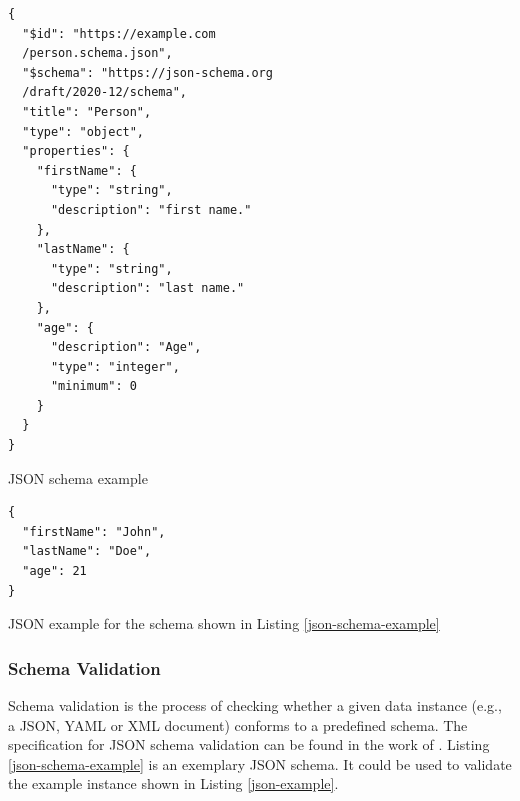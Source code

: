\documentclass[lettersize,journal]{IEEEtran}
\begin{document}
\begin{listing}[!h]
\begin{verbatim}
{
  "$id": "https://example.com
  /person.schema.json",
  "$schema": "https://json-schema.org
  /draft/2020-12/schema",
  "title": "Person",
  "type": "object",
  "properties": {
    "firstName": {
      "type": "string",
      "description": "first name."
    },
    "lastName": {
      "type": "string",
      "description": "last name."
    },
    "age": {
      "description": "Age",
      "type": "integer",
      "minimum": 0
    }
  }
}
\end{verbatim}
\caption{JSON schema example} 
\label{json-schema-example}
\end{listing}


\begin{listing}[!h]
\begin{verbatim}
{
  "firstName": "John",
  "lastName": "Doe",
  "age": 21
}
\end{verbatim}
\caption{JSON example for the schema shown in Listing \ref{json-schema-example}} 
\label{json-example}
\end{listing}


\subsubsection{Schema Validation} %
Schema validation is the process of checking whether a given data instance (e.g., a JSON, YAML or XML document) conforms to a predefined schema. The specification for JSON schema validation can be found in the work of \cite{JSON_schema_vailidation} \cite{JSONValidation}. Listing \ref{json-schema-example} is an exemplary JSON schema. It could be used to validate the example instance shown in Listing \ref{json-example}.




\end{document}
